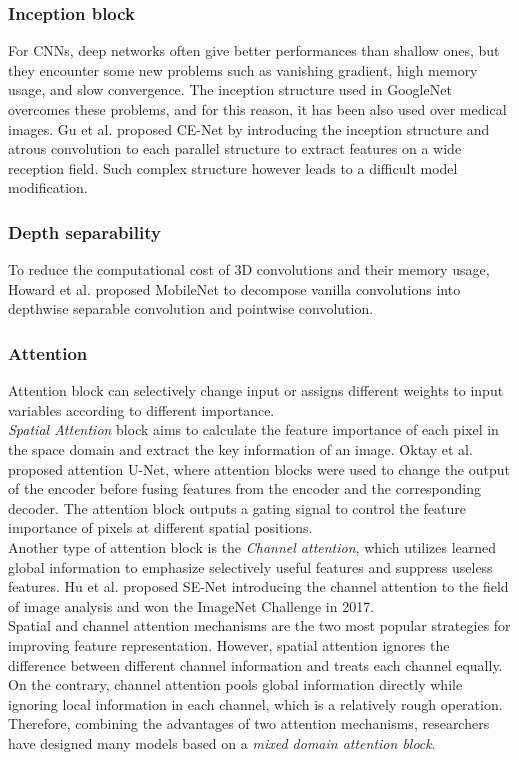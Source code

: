 \subsubsection{Inception block}
For CNNs, deep networks often give better performances than shallow ones, but they encounter some new problems such as vanishing gradient, high memory usage, and slow convergence. The inception structure used in GoogleNet overcomes these problems, and for this reason, it has been also used over medical images. Gu et al. proposed CE-Net by introducing the inception structure and atrous convolution to each parallel structure to extract features on a wide reception field. Such complex structure however leads to a difficult model modification.

\subsubsection{Depth separability}
To reduce the computational cost of 3D convolutions and their memory usage,
Howard et al. proposed MobileNet to decompose vanilla convolutions into
depthwise separable convolution and pointwise convolution.

\subsubsection{Attention}
\par
Attention block can selectively change input or assigns different weights to
input variables according to different importance.\\
\emph{Spatial Attention} block aims
to calculate the feature importance of each pixel in the space domain and extract
the key information of an image. Oktay et al. proposed attention U-Net, where
attention blocks were used to change the output of the encoder before fusing
features from the encoder and the corresponding decoder. The attention block
outputs a gating signal to control the feature importance of pixels at different
spatial positions.\\
Another type of attention block is the \emph{Channel attention},
which utilizes learned global information to emphasize selectively useful
features and suppress useless features. Hu et al. proposed SE-Net
introducing the channel attention to the field of image analysis and won the
ImageNet Challenge in 2017.\\
Spatial and channel attention mechanisms are the two most popular strategies for
improving feature representation. However, spatial attention ignores the
difference between different channel information and treats each channel equally. On
the contrary, channel attention pools global information directly while
ignoring local information in each channel, which is a relatively rough
operation. Therefore, combining the advantages of two attention mechanisms,
researchers have designed many models based on a \emph{mixed domain attention block}.

